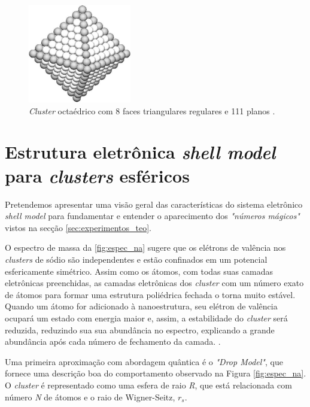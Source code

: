 \begin{figure}
  \centering
  \includegraphics[width=0.4\textwidth]{images/clusters/octaedro.jpg}
  \caption{\textit{Cluster} octaédrico com 8 faces triangulares regulares e 111 planos  \cite{KATAKUSE1985229}.  }
  \label{fig:octaedro}
\end{figure}


\section{Estrutura eletrônica \textit{shell model} para \textit{clusters} esféricos} \label{section_shell_model}

 Pretendemos apresentar uma visão geral das características do sistema eletrônico \textit{shell model} para fundamentar e entender o aparecimento dos \textit{"números mágicos"} vistos na secção \ref{sec:experimentos_teo}.

O espectro de massa da \ref{fig:espec_na} sugere que os elétrons de valência nos \textit{clusters} de sódio são independentes e estão confinados em um potencial esfericamente simétrico. Assim como os átomos, com todas suas camadas eletrônicas preenchidas, as camadas eletrônicas dos \textit{cluster} com um número exato de átomos para formar uma estrutura poliédrica fechada o torna muito estável. Quando um átomo for adicionado à nanoestrutura, seu elétron de valência ocupará um estado com energia maior e, assim, a estabilidade do \textit{cluster} será reduzida, reduzindo sua sua abundância no espectro, explicando a grande abundância após cada número de fechamento da camada. \cite{capitulo_livro_shell}.

Uma primeira aproximação com abordagem quântica é o \textit{"Drop Model"}, que fornece uma descrição boa do comportamento observado na Figura \ref{fig:espec_na}. O \textit{cluster} é representado como uma esfera de raio \textit{R}, que está relacionada com número \textit{N} de átomos e o raio de Wigner-Seitz, $r_{s}$\cite{capitulo_livro_shell}\cite{livro_cap16_Misra2012527}.


